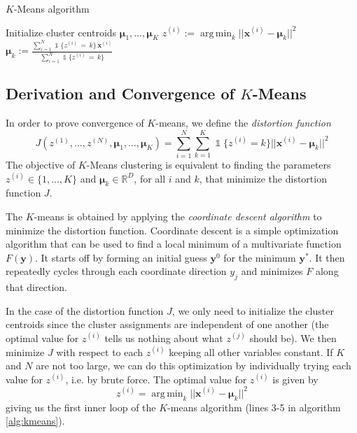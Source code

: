 \documentclass[final,3p,times,twocolumn]{elsarticle}
\DeclareMathOperator*{\argmin}{arg\,min}
\let\bs\boldsymbol
\DeclareMathOperator*{\id}{\mathds{1}}
\begin{document}
\begin{algorithm}
\caption{$K$-Means algorithm}
\label{alg:kmeans}
\begin{algorithmic}[1]
\State Initialize cluster centroids $\bs\mu_1,\dots,\bs\mu_K$
\Statex
\Repeat
{}
\State $z^{(i)} := \argmin_k ||\bs x^{(i)} - \bs\mu_k||^2$
\EndFor
\Statex
{}
\State $\bs\mu_k := \frac{\sum_{i=1}^N \id \{z^{(i)}\,=\,k\}\, \bs x^{(i)}}{\sum_{i=1}^N \id\{z^{(i)}\,=\,k\}}$
\EndFor
{}
\Statex\State\Return{$z^{(1)}, \dots, z^{(N)}, \bs\mu_1, \dots, \bs\mu_K$}
\end{algorithmic}
\end{algorithm}


\subsection{Derivation and Convergence of $K$-Means}
\label{sect:kmeans-derivation}
In order to prove convergence of $K$-means, we define the \emph{distortion function} 
\begin{equation}
\label{eqn:distortion}
J(z^{(1)},\dots,z^{(N)},\bs\mu_1,\dots,\bs\mu_K) = \sum_{i=1}^N \sum_{k=1}^K \id\{z^{(i)}=k\}||\bs x^{(i)} - \bs \mu_k||^2
\end{equation}
The objective of $K$-Means clustering is equivalent to finding the parameters $z^{(i)} \in \{1,\dots,K\}$ and $\bs\mu_k\in\mathbb{R}^D$, for all $i$ and $k$, that minimize the distortion function $J$.

The $K$-means is obtained by applying the \emph{coordinate descent algorithm} to minimize the distortion function.
Coordinate descent is a simple optimization algorithm that can be used to find a local minimum of a multivariate function $F(\bs y)$.
It starts off by forming an initial guess $\bs y^{0}$ for the minimum $\bs y^*$. 
It then repeatedly cycles through each coordinate direction $y_j$ and minimizes $F$ along that direction.

In the case of the distortion function $J$, we only need to initialize the cluster centroids since the cluster assignments are independent of one another (the optimal value for $z^{(i)}$ tells us nothing about what $z^{(j)}$ should be).
We then minimize $J$ with respect to each $z^{(i)}$ keeping all other variables constant. 
If $K$ and $N$ are not too large, we can do this optimization by individually trying each value for $z^{(i)}$, i.e. by brute force.
The optimal value for $z^{(i)}$ is given by
\begin{equation}
\label{eqn:kmeans-E}
z^{(i)} = \argmin_k ||\bs x^{(i)} - \bs\mu_k||^2
\end{equation}
giving us the first inner loop of the $K$-means algorithm (lines 3-5 in algorithm \ref{alg:kmeans}).
\end{document}
